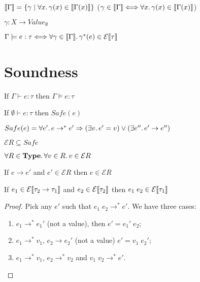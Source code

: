
$\llbracket\Gamma\rrbracket = \{\gamma \mid \forall x\ldotp \gamma(x) \in \llbracket\Gamma(x)\rrbracket\}$
($\gamma \in \llbracket\Gamma\rrbracket \Longleftrightarrow \forall x\ldotp \gamma(x) \in \llbracket\Gamma(x)\rrbracket $)

$\gamma \colon X \to Value_{\emptyset}$

$\Gamma \models e : \tau \Longleftrightarrow \forall \gamma \in \llbracket\Gamma\rrbracket\ldotp \gamma^*(e) \in \mathcal{E}\llbracket\tau\rrbracket$

\section{Soundness}

\begin{theorem}
  If $\Gamma \vdash e : \tau$ then $\Gamma \models e : \tau$
\end{theorem}

\begin{theorem}
  If $\emptyset \vdash e : \tau$ then $Safe(e)$

  $Safe(e) = \forall e'\ldotp e\to^*e' \Rightarrow (\exists v\ldotp e'=v) \lor (\exists e''\ldotp e'\to e'')$
\end{theorem}

\begin{theorem}[Adequacy]
  $\mathcal{E}R \subseteq Safe$
\end{theorem}

\begin{lemma}
  $\forall R \in \textbf{Type}\ldotp \forall v \in R\ldotp v \in \mathcal{E}R$
\end{lemma}

\begin{lemma}
  If $e \to e'$ and $e' \in \mathcal{E}R$ then $e \in \mathcal{E}R$
\end{lemma}

\begin{lemma}
  If $e_1 \in \mathcal{E}\llbracket\tau_2 \to \tau_1\rrbracket$
  and $e_2 \in \mathcal{E}\llbracket\tau_2\rrbracket$
  then $e_1\;e_2 \in \mathcal{E}\llbracket\tau_1\rrbracket$
\end{lemma}
\begin{proof}
  Pick any $e'$ such that $e_1\;e_2 \to^* e'$.
  We have three cases:
  \begin{enumerate}[label=(\roman*)]
  \item $e_1 \to^* e_1'$ (not a value), then $e' = e_1'\;e_2$;
  \item $e_1 \to^* v_1$, $e_2\to e_2'$ (not a value) $e' = v_1\;e_2'$;
  \item $e_1 \to^* v_1$, $e_2 \to^* v_2$ and $v_1\;v_2 \to^* e'$.
    \qedhere
  \end{enumerate}
\end{proof}

